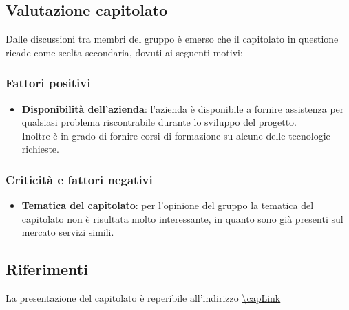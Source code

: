 \subsection{Valutazione capitolato}
Dalle discussioni tra membri del gruppo è emerso che il capitolato in questione ricade come scelta secondaria, dovuti ai seguenti motivi:

\subsubsection{Fattori positivi}

\begin{itemize}
    \item \textbf{Disponibilità dell'azienda}: l'azienda è disponibile a fornire assistenza per qualsiasi problema riscontrabile durante lo sviluppo del progetto. \\
    Inoltre è in grado di fornire corsi di formazione su alcune delle tecnologie richieste.
\end{itemize}

\subsubsection{Criticità e fattori negativi}

\begin{itemize}
    \item \textbf{Tematica del capitolato}: per l'opinione del gruppo la tematica del capitolato non è risultata molto interessante, in quanto sono già presenti sul mercato servizi simili.
\end{itemize}

\subsection{Riferimenti}
La presentazione del capitolato è reperibile all'indirizzo \url{\capLink}